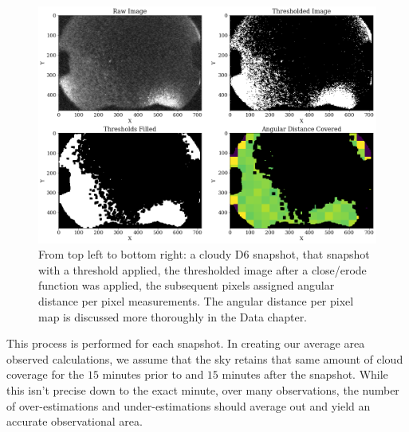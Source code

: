 \begin{figure}[ht!]
  \centering
  \includegraphics[scale=0.4]{images/Cloud_analysis.png}
  \caption[Calculating cloud area coverage from thresholding and applying our angular distance per pixel map.]{From top left to bottom right: a cloudy D6 snapshot, that snapshot with a threshold applied, the thresholded image after a close/erode function was applied, the subsequent pixels assigned angular distance per pixel measurements.  The angular distance per pixel map is discussed more thoroughly in the Data chapter.}
  \label{colorclouds}
\end{figure}

This process is performed for each snapshot.
In creating our average area observed calculations, we assume that the sky retains that same amount of cloud coverage for the $15$ minutes prior to and $15$ minutes after the snapshot.
While this isn't precise down to the exact minute, over many observations, the number of over-estimations and under-estimations should average out and yield an accurate observational area.























 
